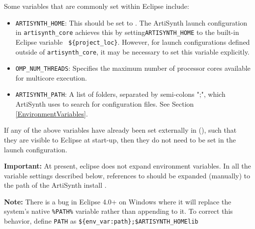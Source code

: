 Some variables that are commonly set within Eclipse include:

\begin{itemize}

\item {\tt ARTISYNTH\_HOME}: This should be set to 
\ArtHome[]. The ArtiSynth launch
configuration in {\tt artisynth\_core} achieves this by
setting{\tt ARTISYNTH\_HOME} to the built-in Eclipse variable {\tt
\$\{project\_loc\}}. However, for launch configurations defined
outside of {\tt artisynth\_core}, it may be necessary to set this
variable explicitly.

\item {\tt OMP\_NUM\_THREADS}: Specifies the maximum number of processor cores
available for multicore execution.

\item {\tt ARTISYNTH\_PATH}: A list of folders, separated by semi-colons ";", 
which ArtiSynth uses to search for configuration files. 
See Section \ref{EnvironmentVariables}.

\end{itemize}

If any of the above variables have already been set externally in
\SYSTEM{} (\environmentSectionRef), such that they are visible
to Eclipse at start-up, then they do not need to be set in the launch
configuration.


\ifNeedLibraryPath

\begin{sideblock}
{\bf Important:} At present, eclipse does not expand environment variables.
In all the variable settings described below, references to 
\ArtHome[]should be expanded (manually) to the path of the
ArtiSynth install \directory{}.
\end{sideblock}

\ifWindows
\begin{sideblock}
{\bf Note:} There is a bug in Eclipse 4.0+ on Windows where it will replace 
the system's native {\tt \%PATH\%} variable rather than appending to it.  
To correct this behavior, define {\tt PATH} as 
{\tt \$\{env\_var:path\};\$ARTISYNTH\_HOME\SEP lib\SEP \ARCH{}} 
\end{sideblock}
\fi
\fi

